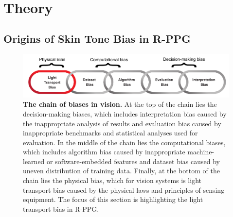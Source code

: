 %
%

\chapter{Theory} \label{chap:theory}

\section{Origins of Skin Tone Bias in R-PPG}

\begin{figure}[t]
    \centering
    \includegraphics[width=\linewidth]{include/F_chain2.pdf}
    \caption{\textbf{The chain of biases in vision.} At the top of the chain lies the decision-making biases, which includes interpretation bias caused by the inappropriate analysis of results and evaluation bias caused by inappropriate benchmarks and statistical analyses used for evaluation. In the middle of the chain lies the computational biases, which includes algorithm bias caused by inappropriate machine-learned or software-embedded features and dataset bias caused by uneven distribution of training data. Finally, at the bottom of the chain lies the physical bias, which for vision systems is light transport bias caused by the physical laws and principles of sensing equipment. The focus of this section is highlighting the light transport bias in R-PPG.}
    \label{fig:chain_bias}
\end{figure}

